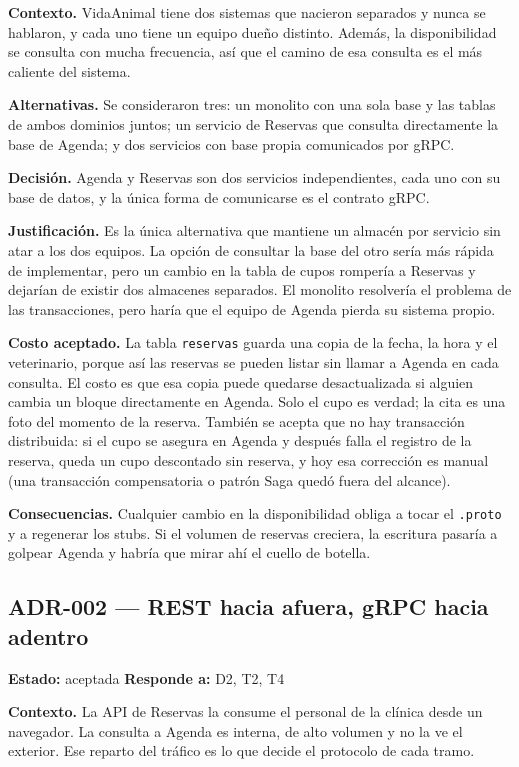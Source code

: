 \documentclass[12pt, a4paper]{article}
\begin{document}
\textbf{Contexto.} VidaAnimal tiene dos sistemas que nacieron separados y
nunca se hablaron, y cada uno tiene un equipo dueño distinto. Además, la
disponibilidad se consulta con mucha frecuencia, así que el camino de esa
consulta es el más caliente del sistema.

\textbf{Alternativas.} Se consideraron tres: un monolito con una sola base
y las tablas de ambos dominios juntos; un servicio de Reservas que
consulta directamente la base de Agenda; y dos servicios con base propia
comunicados por gRPC.

\textbf{Decisión.} Agenda y Reservas son dos servicios independientes,
cada uno con su base de datos, y la única forma de comunicarse es el
contrato gRPC.

\textbf{Justificación.} Es la única alternativa que mantiene un almacén por
servicio sin atar a los dos equipos. La opción de consultar la base del
otro sería más rápida de implementar, pero un cambio en la tabla de cupos
rompería a Reservas y dejarían de existir dos almacenes separados. El
monolito resolvería el problema de las transacciones, pero haría que el
equipo de Agenda pierda su sistema propio.

\textbf{Costo aceptado.} La tabla \texttt{reservas} guarda una copia de la
fecha, la hora y el veterinario, porque así las reservas se pueden listar
sin llamar a Agenda en cada consulta. El costo es que esa copia puede
quedarse desactualizada si alguien cambia un bloque directamente en
Agenda. Solo el cupo es verdad; la cita es una foto del momento de la
reserva. También se acepta que no hay transacción distribuida: si el
cupo se asegura en Agenda y después falla el registro de la reserva,
queda un cupo descontado sin reserva, y hoy esa corrección es manual (una
transacción compensatoria o patrón Saga quedó fuera del alcance).

\textbf{Consecuencias.} Cualquier cambio en la disponibilidad obliga a
tocar el \texttt{.proto} y a regenerar los stubs. Si el volumen de
reservas creciera, la escritura pasaría a golpear Agenda y habría que
mirar ahí el cuello de botella.

\subsection{ADR-002 \texorpdfstring{---}{---} REST hacia afuera, gRPC hacia adentro}

\textbf{Estado:} aceptada \hfill \textbf{Responde a:} D2, T2, T4

\textbf{Contexto.} La API de Reservas la consume el personal de la clínica
desde un navegador. La consulta a Agenda es interna, de alto volumen y no
la ve el exterior. Ese reparto del tráfico es lo que decide el protocolo
de cada tramo.
\end{document}
